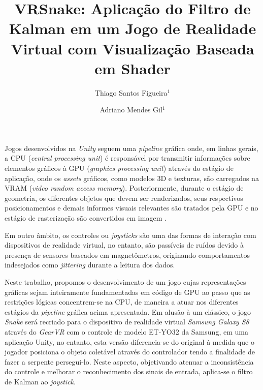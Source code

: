 \documentclass{vgtc}                          %
\title{VRSnake: Aplicação do Filtro de Kalman em um Jogo de Realidade Virtual com Visualização Baseada em Shader}
\author{Thiago Santos Figueira$^{1}$
\and Adriano Mendes Gil$^{1}$}
\affiliation{\scriptsize $^{1}$Samsung Instituto de Desenvolvimento para a Informática da Amazônia (SIDIA), Manaus, Brazil\\}
\begin{document}

\maketitle

Jogos desenvolvidos na \textit{Unity} seguem uma \textit{pipeline} gráfica onde, em linhas gerais, a CPU (\textit{central processing unit}) é responsável por transmitir informações sobre elementos gráficos à GPU (\textit{graphics processing unit}) através do estágio de aplicação, onde os \textit{assets} gráficos, como modelos 3D e texturas, são carregados na VRAM (\textit{video random access memory}). Posteriormente, durante o estágio de geometria, os diferentes objetos que devem ser renderizados, seus respectivos posicionamentos e demais informes visuais relevantes são tratados pela GPU e no estágio de rasterização são convertidos em imagem \cite{akenine2008real}.

Em outro âmbito, os controles ou \textit{joysticks} são uma das formas de interação com dispositivos de realidade virtual, no entanto, são passíveis de ruídos devido à presença de sensores baseados em magnetômetros, originando comportamentos indesejados como \textit{jittering} durante a leitura dos dados. 

Neste trabalho, propomos o desenvolvimento de um jogo cujas representações gráficas sejam inteiramente fundamentadas em código de GPU ao passo que as restrições lógicas concentrem-se na CPU, de maneira a atuar nos diferentes estágios da \textit{pipeline} gráfica acima apresentada. Em alusão à um clássico, o jogo \textit{Snake} será recriado para o dispositivo de realidade virtual \textit{Samsung Galaxy S8} através do \textit{GearVR} com o controle de modelo ET-YO32 da Samsung, em uma aplicação Unity, no entanto, esta versão diferencia-se do original à medida que o jogador posiciona o objeto coletável através do controlador tendo a finalidade de fazer a serpente persegui-lo. Neste aspecto, objetivando atenuar a inconsistência do controle e melhorar o reconhecimento dos sinais de entrada, aplica-se o filtro de Kalman ao \textit{joystick}.
\end{document}
